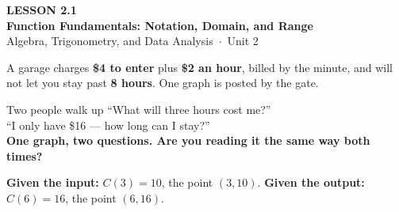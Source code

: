 \documentclass[aspectratio=169, 11pt]{beamer}
\begin{document}
{
\begin{frame}[plain]
  \vspace{2.8cm}\hspace{0.55cm}%
  \begin{minipage}{0.9\textwidth}
    {\color{goldacc}\bfseries\small LESSON 2.1}\\[0.5cm]
    {\color{white}\bfseries\LARGE Function Fundamentals: Notation, Domain, and Range}\\[1.2cm]
    {\color{mistmid}\small Algebra, Trigonometry, and Data Analysis~$\cdot$~Unit 2}
  \end{minipage}
\end{frame}
}

\begin{frame}[t, plain]
  A garage charges \textbf{\$4 to enter} plus \textbf{\$2 an hour}, billed by the minute, and will
  not let you stay past \textbf{8 hours}. One graph is posted by the gate.
  \begin{block}{Two people walk up}
    ``What will three hours cost me?''\\
    ``I only have \$16 --- how long can I stay?''\\[2pt]
    \textbf{One graph, two questions. Are you reading it the same way both times?}
  \end{block}
\end{frame}

\begin{frame}[t, plain]
  \begin{center}
  \end{center}
  \vspace{-0.2cm}
  \textbf{Given the input:} $C(3)=10$, the point $(3,10)$. \quad
  \textbf{Given the output:} $C(6)=16$, the point $(6,16)$.
\end{frame}
\end{document}
